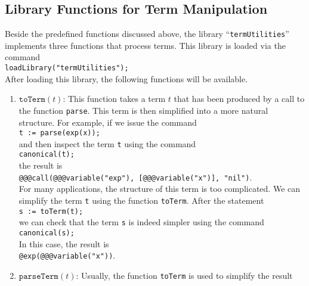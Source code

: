 \subsection{Library Functions for Term Manipulation}
Beside the predefined functions discussed above, the library ``\texttt{termUtilities}'' implements
three functions that process terms.  This library is loaded via the command
\\[0.2cm]
\hspace*{1.3cm}
\texttt{loadLibrary("termUtilities");}
\\[0.2cm]
After loading this library, the following functions will be available.
\begin{enumerate}
\item $\texttt{toTerm}(t)$:  This function takes a term $t$ that has been produced by a call to the function
      \texttt{parse}.  This term is then simplified into a more natural structure.  For example, if we issue
      the command
      \\[0.2cm]
      \hspace*{1.3cm}
      \texttt{t := parse(exp(x));}
      \\[0.2cm] 
      and then inspect the term \texttt{t} using the command
      \\[0.2cm]
      \hspace*{1.3cm}
      \texttt{canonical(t);}
      \\[0.2cm]
      the result is
      \\[0.2cm]
      \hspace*{1.3cm}
      \texttt{@@@call(@@@variable("exp"), [@@@variable("x")], "nil")}.
      \\[0.2cm]
      For many applications, the structure of this term is too complicated.  We can simplify the
      term \texttt{t} using the function \texttt{toTerm}.  After the statement
      \\[0.2cm]
      \hspace*{1.3cm}
      \texttt{s := toTerm(t);}
      \\[0.2cm]
      we can check that the term \texttt{s} is indeed simpler using the command
      \\[0.2cm]
      \hspace*{1.3cm}
      \texttt{canonical(s);}
      \\[0.2cm]
      In this case, the result is
      \\[0.2cm]
      \hspace*{1.3cm}
      \texttt{@exp(@@@variable("x"))}.
\item $\texttt{parseTerm}(t)$:  Usually, the function \texttt{toTerm} is used to simplify the result

\end{enumerate}
